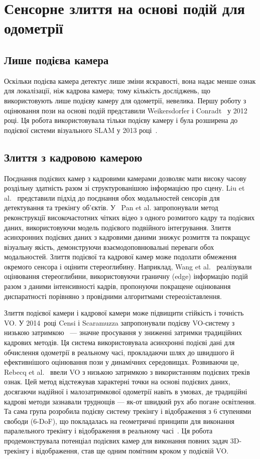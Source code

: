 \section{Сенсорне злиття на основі подій для одометрії}\label{sec:fusion}
\subsection{Лише подієва камера}
Оскільки подієва камера детектує лише зміни яскравості, вона надає менше ознак для локалізації, ніж кадрова камера; тому кількість досліджень, що використовують лише подієву камеру для одометрії, невелика. Першу роботу з оцінювання пози на основі подій представили Weikersdorfer і Conradt~\cite{weikersdorfer2012event} у 2012 році. Ця робота використовувала тільки подієву камеру і була розширена до подієвої системи візуального SLAM у 2013 році~\cite{weikersdorfer2013simultaneous}.

\subsection{Злиття з кадровою камерою}
Поєднання подієвих камер з кадровими камерами дозволяє мати високу часову роздільну здатність разом зі структурованішою інформацією про сцену. Liu et al.~\cite{liu2016combined} представили підхід до поєднання обох модальностей сенсорів для детектування та трекінгу об'єктів.
У~\cite{Pan_2019_CVPR} Pan et al. запропонували метод реконструкції високочастотних чітких відео з одного розмитого кадру та подієвих даних, використовуючи модель подієвого подвійного інтегрування. Злиття асинхронних подієвих даних з кадровими даними знижує розмиття та покращує візуальну якість, демонструючи взаємодоповнювальні переваги обох модальностей.
Злиття подієвої та кадрової камер може подолати обмеження окремого сенсора і оцінити стереоглибину. Наприклад, Wang et al.~\cite{wang2021stereo} реалізували оцінювання стереоглибини, використовуючи граничну (edge) інформацію подій разом з даними інтенсивності кадрів, пропонуючи покращене оцінювання диспаратності порівняно з провідними алгоритмами стереозіставлення.

Злиття подієвої камери і кадрової камери може підвищити стійкість і точність VO. У 2014~році Censi і Scaramuzza запропонували подієву VO-систему з низькою затримкою~\cite{censi2014low} — значне просування у зниженні затримки традиційних кадрових методів. Ця система використовувала асинхронні подієві дані для обчислення одометрії в реальному часі, прокладаючи шлях до швидшого й ефективнішого оцінювання пози у динамічних середовищах. Розвиваючи це, Rebecq et al.~\cite{kueng2016low} ввели VO з низькою затримкою з використанням подієвих треків ознак. Цей метод відстежував характерні точки на основі подієвих даних, досягаючи надійної і малозатримкової одометрії навіть в умовах, де традиційні кадрові методи зазнавали труднощів — як-от швидкий рух або погане освітлення.
Та сама група розробила подієву систему трекінгу і відображення з 6 ступенями свободи (6-DoF), що покладалась на геометричні принципи для виконання паралельного трекінгу і відображення в реальному часі~\cite{rebecq2016evo}. Ця робота продемонструвала потенціал подієвих камер для виконання повних задач 3D-трекінгу і відображення, став ще одним помітним кроком у подієвій VO.

